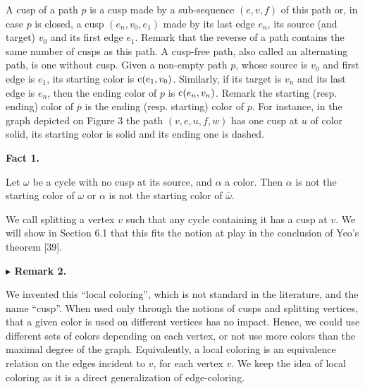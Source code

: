  
 
A cusp of a path $p$ is a cusp made by a sub-sequence $(e,v,f)$ of this path or, in case $p$ is closed, a cusp $(e_{n},v_{0},e_{1})$ made by its last edge $e_{n}$, its source (and target) $v_{0}$ and its first edge $e_{1}$. Remark that the reverse of a path contains the same number of cusps as this path. A cusp-free path, also called an alternating path, is one without cusp. Given a non-empty path $p$, whose source is $v_{0}$ and first edge is $e_{1}$, its starting color is $\textnormal{{c}}(e_{1},v_{0})$. Similarly, if its target is $v_{n}$ and its last edge is $e_{n}$, then the ending color of $p$ is $\textnormal{{c}}(e_{n},v_{n})$. Remark the starting (resp. ending) color of $\overline{p}$ is the ending (resp. starting) color of $p$. For instance, in the graph depicted on Figure 3 the path $(v,e,u,f,w)$ has one cusp at $u$ of color solid, its starting color is solid and its ending one is dashed.\par
 
 
 
\par\medskip\noindent\textbf{Fact 1.}\par
 
 
Let $\omega$ be a cycle with no cusp at its source, and $\alpha$ a color. Then $\alpha$ is not the starting color of $\omega$ or $\alpha$ is not the starting color of $\overline{\omega}$.\par
 
 
 
 
We call splitting a vertex $v$ such that any cycle containing it has a cusp at $v$. We will show in Section 6.1 that this fits the notion at play in the conclusion of Yeo’s theorem [39].\par
 
 
 
\par\medskip\noindent\textbf{$\blacktriangleright$ Remark 2.}\par
 
 
We invented this “local coloring”, which is not standard in the literature, and the name “cusp”. When used only through the notions of cusps and splitting vertices, that a given color is used on different vertices has no impact. Hence, we could use different sets of colors depending on each vertex, or not use more colors than the maximal degree of the graph. Equivalently, a local coloring is an equivalence relation on the edges incident to $v$, for each vertex $v$. We keep the idea of local coloring as it is a direct generalization of edge-coloring.\par
 
